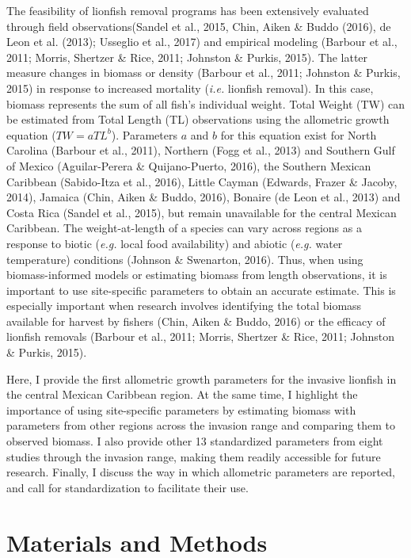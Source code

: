 \documentclass[12pt,]{article}
\begin{document}
The feasibility of lionfish removal programs has been extensively
evaluated through field observations(Sandel et al., 2015, Chin, Aiken \&
Buddo (2016), de Leon et al. (2013); Usseglio et al., 2017) and
empirical modeling (Barbour et al., 2011; Morris, Shertzer \& Rice,
2011; Johnston \& Purkis, 2015). The latter measure changes in biomass
or density (Barbour et al., 2011; Johnston \& Purkis, 2015) in response
to increased mortality (\emph{i.e.} lionfish removal). In this case,
biomass represents the sum of all fish's individual weight. Total Weight
(TW) can be estimated from Total Length (TL) observations using the
allometric growth equation (\(TW = aTL^b\)). Parameters \(a\) and \(b\)
for this equation exist for North Carolina (Barbour et al., 2011),
Northern (Fogg et al., 2013) and Southern Gulf of Mexico (Aguilar-Perera
\& Quijano-Puerto, 2016), the Southern Mexican Caribbean (Sabido-Itza et
al., 2016), Little Cayman (Edwards, Frazer \& Jacoby, 2014), Jamaica
(Chin, Aiken \& Buddo, 2016), Bonaire (de Leon et al., 2013) and Costa
Rica (Sandel et al., 2015), but remain unavailable for the central
Mexican Caribbean. The weight-at-length of a species can vary across
regions as a response to biotic (\emph{e.g.} local food availability)
and abiotic (\emph{e.g.} water temperature) conditions (Johnson \&
Swenarton, 2016). Thus, when using biomass-informed models or estimating
biomass from length observations, it is important to use site-specific
parameters to obtain an accurate estimate. This is especially important
when research involves identifying the total biomass available for
harvest by fishers (Chin, Aiken \& Buddo, 2016) or the efficacy of
lionfish removals (Barbour et al., 2011; Morris, Shertzer \& Rice, 2011;
Johnston \& Purkis, 2015).

Here, I provide the first allometric growth parameters for the invasive
lionfish in the central Mexican Caribbean region. At the same time, I
highlight the importance of using site-specific parameters by estimating
biomass with parameters from other regions across the invasion range and
comparing them to observed biomass. I also provide other 13 standardized
parameters from eight studies through the invasion range, making them
readily accessible for future research. Finally, I discuss the way in
which allometric parameters are reported, and call for standardization
to facilitate their use.

\clearpage

\section{Materials and Methods}\label{materials-and-methods}
\end{document}
